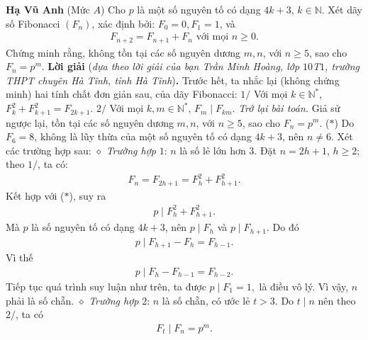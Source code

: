 \begin{multicols}{2}
	\vskip 0.2cm
	\hfill	\textbf{\color{thachthuctoanhoc}Hạ Vũ Anh}
	\vskip 0.2cm
	{}
	(Mức $A$)
	Cho $p$ là một số nguyên tố có dạng $4k + 3$, $k \in \mathbb{N}$. Xét dãy số Fibonacci $(F_n)$, xác định bởi: $F_0 = 0, F_1 = 1$,    và
	\begin{align*}
		 {F_{n + 2}} = {F_{n + 1}} + {F_n}	\text{ với mọi } n \ge 0.
	\end{align*}
	Chứng minh rằng, không tồn tại các số nguyên dương $m, n$, với $n \ge 5$, sao cho \linebreak $F_n = p^m$.
	\vskip 0.05cm
	\textbf{\color{thachthuctoanhoc}Lời giải} (\textit{dựa theo lời giải của bạn Trần Minh Hoàng, lớp $10$T$1$, trường THPT chuyên Hà Tĩnh, tỉnh Hà Tĩnh})\textbf{\color{thachthuctoanhoc}.}
	\vskip 0.05cm
	Trước hết, ta nhắc lại (không chứng minh) hai tính chất đơn giản sau, của dãy Fibonacci:
	\vskip 0.05cm
	$1/$ Với mọi  $k \in \mathbb{N^*}$, $F_k^2 + F_{k + 1}^2 = {F_{2k + 1}}.$
	\vskip 0.05cm
	$2/$ Với mọi $k, m \in \mathbb{N^*}$, ${F_m}\mid{F_{km}}.$
	\vskip 0.05cm
	\textit{Trở lại bài toán.}
	\vskip 0.05cm
	Giả sử ngược lại, tồn tại các số nguyên dương $m, n$, với $n \ge 5$, sao cho  $F_n = p^m$. \hfill ($*$)
	\vskip 0.05cm
	Do $F_6 = 8$, không là lũy thừa của một số nguyên tố có dạng $4k + 3$, nên $n \ne 6$.
	\vskip 0.05cm
	Xét các trường hợp sau:
	\vskip 0.05cm
	$\diamond$ \textit{Trường hợp} $1$: $n$ là số lẻ lớn hơn $3$.
	\vskip 0.05cm
	Đặt $n = 2h + 1$, $h \ge 2$; theo $1/$, ta có:
	\begin{align*}
		{F_n} = {F_{2h + 1}} = F_h^2 + F_{h + 1}^2.
	\end{align*}
	Kết hợp với ($*$), suy ra
	\begin{align*}
		p\mid F_h^2 + F_{h + 1}^2.
	\end{align*}
	Mà $p$ là số nguyên tố có dạng $4k + 3$, nên $p\mid {F_h}$ và $p\mid {F_{h + 1}}$.  Do đó
	\begin{align*}
		p\mid{F_{h + 1}} - {F_h} = {F_{h - 1}}.
	\end{align*}
	Vì thế
	\begin{align*}
		p\mid{F_h} - {F_{h - 1}} = {F_{h - 2}}.
	\end{align*}
	Tiếp tục quá trình suy luận như trên, ta được $p\mid{F_1} = 1,$  là điều vô lý. Vì vậy, $n$ phải là số chẵn.
	\vskip 0.05cm
	$\diamond$ \textit{Trường hợp} $2$: $n$ là số chẵn, có ước lẻ $t > 3$.
	\vskip 0.05cm
	Do $t \mid n $  nên theo $2/$, ta có
	\begin{align*}
		{F_t}\mid{F_n} = {p^m}. 
	\end{align*}

\end{multicols}
